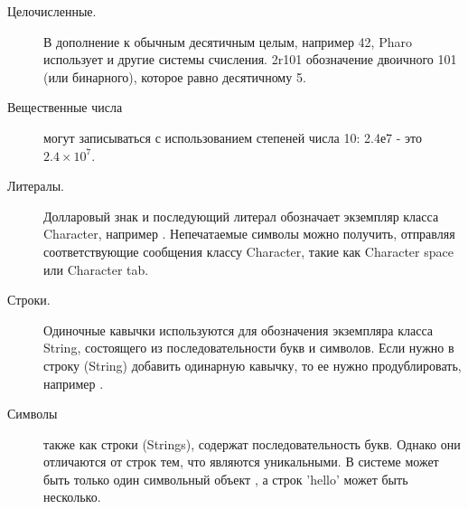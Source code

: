\documentclass[a4paper,10pt,twoside]{book}
\begin{document}
\begin{description}
\item[Целочисленные.] В дополнение к обычным десятичным целым, например 42, Pharo использует и другие системы счисления.
	2r101 обозначение двоичного 101 (или бинарного), которое равно десятичному 5.

\item[Вещественные числа] могут записываться с использованием степеней числа 10: 2.4е7 - это $2.4\times 10^7$.

\item[Литералы.] Долларовый знак и последующий литерал обозначает экземпляр класса Character, например .
		Непечатаемые символы можно получить, отправляя соответствующие сообщения классу Character, такие как Character space или Character tab.
		
\item[Строки.] Одиночные кавычки используются для обозначения экземпляра класса String, состоящего из последовательности букв и символов.
		Если нужно в строку (String) добавить одинарную кавычку, то ее нужно продублировать, например .

\item[Символы] также как строки (Strings), содержат последовательность букв.
		Однако они отличаются от строк тем, что являются уникальными.
		В системе может быть только один символьный объект , а строк 'hello' может быть несколько.


\end{description}
\end{document}
